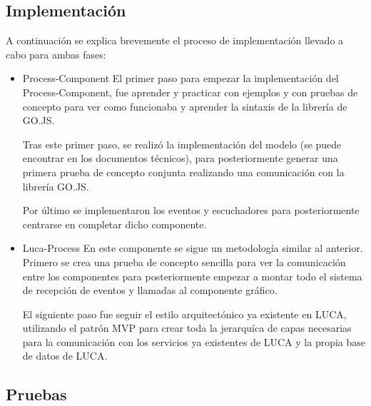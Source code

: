 \subsection{Implementación}
	A continuación se explica brevemente el proceso de implementación llevado a cabo para ambas fases:
	\begin{itemize}
		\item Process-Component
			\subitem El primer paso para empezar la implementación del Process-Component, fue aprender y practicar con ejemplos y con pruebas de concepto para ver como funcionaba y aprender la sintaxis de la librería de GO.JS.
			
			Tras este primer paso, se realizó la implementación del modelo (se puede encontrar en los documentos técnicos), para posteriormente generar una primera prueba de concepto conjunta realizando una comunicación con la librería GO.JS.
			
			
			Por último se implementaron los eventos y escuchadores para posteriormente centrarse en completar dicho componente.
			
			
			
		\item  Luca-Process
			\subitem En este componente se sigue un metodología similar al anterior. Primero se crea una prueba de concepto sencilla para ver la comunicación entre los componentes para posteriormente empezar a montar todo el sistema de recepción de eventos y llamadas al componente gráfico.
			
			\vspace{5mm}
			
			El siguiente paso fue seguir el estilo arquitectónico ya existente en LUCA, utilizando el patrón MVP\cite{mvp} para crear toda la jerarquíca de capas necesarias para la comunicación con los servicios ya existentes de LUCA y la propia base de datos de LUCA.
		
	\end{itemize}


	
\subsection{Pruebas}

